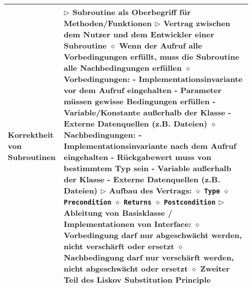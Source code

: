 \begin{longtable}{ | p{} p{} | }
	\makecell[l]{Korrektheit von \\ Subroutinen} & \makecell[l]{
	$\rhd$ Subroutine als Oberbegriff für Methoden/Funktionen \\
	$\rhd$ Vertrag zwischen dem Nutzer und dem Entwickler einer Subroutine \\
	\hspace{0.4cm} $\diamond$ Wenn der Aufruf alle Vorbedingungen erfüllt, \\
	\hspace{0.8cm} muss die Subroutine alle Nachbedingungen erfüllen \\
	\hspace{0.4cm} $\diamond$ Vorbedingungen: \\
	\hspace{0.6cm} - Implementationsinvariante vor dem Aufruf eingehalten \\
	\hspace{0.6cm} - Parameter müssen gewisse Bedingungen erfüllen \\
	\hspace{0.6cm} - Variable/Konstante au\ss erhalb der Klasse \\
	\hspace{0.6cm} - Externe Datenquellen (z.B. Dateien) \\
	\hspace{0.4cm} $\diamond$ Nachbedingungen: \\
	\hspace{0.6cm} - Implementationsinvariante nach dem Aufruf eingehalten \\
	\hspace{0.6cm} - Rückgabewert muss von bestimmtem Typ sein \\
	\hspace{0.6cm} - Variable au\ss erhalb der Klasse \\
	\hspace{0.6cm} - Externe Datenquellen (z.B. Dateien) \\
	$\rhd$ Aufbau des Vertrags: \\
	\hspace{0.4cm} $\diamond$ \texttt{Type} \\
	\hspace{0.4cm} $\diamond$ \texttt{Precondition} \\
	\hspace{0.4cm} $\diamond$ \texttt{Returns} \\
	\hspace{0.4cm} $\diamond$ \texttt{Postcondition} \\
	$\rhd$ Ableitung von Basisklasse / Implementationen von Interface: \\
	\hspace{0.4cm} $\diamond$ Vorbedingung darf nur abgeschwächt werden, nicht verschärft oder ersetzt \\
	\hspace{0.4cm} $\diamond$ Nachbedingung darf nur verschärft werden, nicht abgeschwächt oder ersetzt \\
	\hspace{0.4cm} $\diamond$ Zweiter Teil des Liskov Substitution Principle} \\ \hline
	

\end{longtable}
